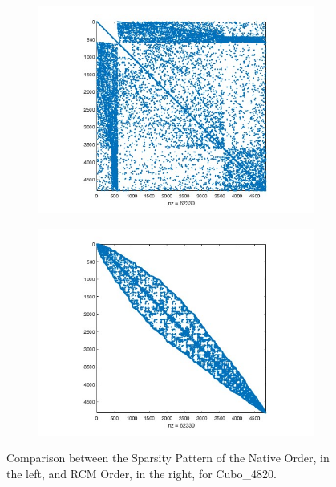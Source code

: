 \documentclass[hidelinks]{article}
\begin{document}
\begin{figure}[H]
    \centering
    \begin{subfigure}{.45\textwidth}
        \includegraphics[width = \textwidth]{pic/topol4820_native.jpg}
    \end{subfigure} \hfill
    \begin{subfigure}{.45\textwidth}
        \includegraphics[width = \textwidth]{pic/topol4820_rcm.jpg}
    \end{subfigure} 
    \caption{Comparison between the Sparsity Pattern of the Native Order, in the left, and RCM Order, in the right, for Cubo\_4820.}\label{fig:rcm}
\end{figure}
\end{document}
